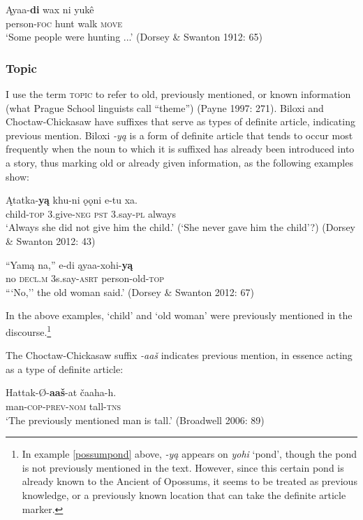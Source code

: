 \documentclass[output=paper]{LSP/langsci}
\begin{document}
\ea
\gll	Ąyaa-\textbf{di} wax ni yukê \\
	person-\textsc{foc} hunt walk \textsc{move}\\
\glt `Some people were hunting ...' (Dorsey \& Swanton 1912: 65)
\z

\subsubsection{Topic}

I use the term \textsc{topic} to refer to old, previously mentioned, or known information (what Prague School linguists call “theme”) (Payne 1997: 271). Biloxi and Choctaw-Chickasaw have suffixes that serve as types of definite article, indicating previous mention. Biloxi \emph{-yą} is a form of definite article that tends to occur most frequently when the noun to which it is suffixed has already been introduced into a story, thus marking old or already given information, as the following examples show: 

\ea
\gll	Ątatka-\textbf{yą } khu-ni 	 ǫǫni e-tu 	 xa.\\ 
child-\textsc{top} 3.give-\textsc{neg} \textsc{pst} 	 3.say-\textsc{pl} always \\
\glt `Always she did not give him the child.' (`She never gave him the child'?) (Dorsey \& Swanton 2012: 43)
\z

\ea
\gll	“Yamą na,” 	 e-di 	 ąyaa-xohi-\textbf{yą}\\
	\hspace{.6em}no 	\textsc{decl.m} 3s.say-\textsc{asrt} person-old-\textsc{top} \\
\glt ```No,'' the old woman said.' (Dorsey \& Swanton 2012: 67)
\z

In the above examples, `child' and `old woman' were previously mentioned in the discourse.\footnote{In example \ref{possumpond} above, \emph{-yą} appears on \emph{yohi} `pond', though the pond is not previously mentioned in the text. However, since this certain pond is already known to the Ancient of Opossums, it seems to be treated as previous knowledge, or a previously known location that can take the definite article marker.}

	The Choctaw-Chickasaw suffix \emph{-aaš} indicates previous mention, in essence acting as a type of definite article:

\ea
\gll	Hattak-Ø-\textbf{aaš}-at čaaha-h.\\
	man-\textsc{cop-prev-nom} tall-\textsc{tns} \\
\glt `The previously mentioned man is tall.' 
(Broadwell 2006: 89)
\z
\end{document}
